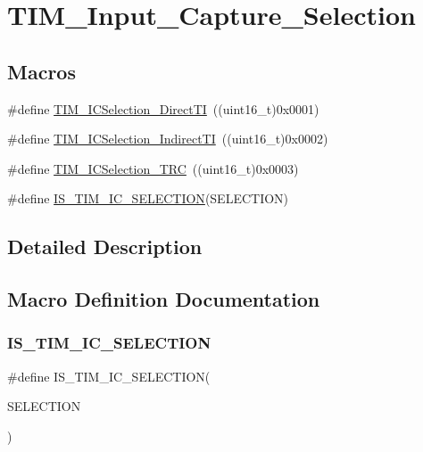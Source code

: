 \hypertarget{group___t_i_m___input___capture___selection}{}\section{T\+I\+M\+\_\+\+Input\+\_\+\+Capture\+\_\+\+Selection}
\label{group___t_i_m___input___capture___selection}
\subsection*{Macros}
\begin{DoxyCompactItemize}
\item 
\#define \mbox{\hyperlink{group___t_i_m___input___capture___selection_ga3d38876044457b7faefe951d367ac8c3}{T\+I\+M\+\_\+\+I\+C\+Selection\+\_\+\+Direct\+TI}}~((uint16\+\_\+t)0x0001)
\item 
\#define \mbox{\hyperlink{group___t_i_m___input___capture___selection_ga2289b684133ac0b81ddfcd860d01b144}{T\+I\+M\+\_\+\+I\+C\+Selection\+\_\+\+Indirect\+TI}}~((uint16\+\_\+t)0x0002)
\item 
\#define \mbox{\hyperlink{group___t_i_m___input___capture___selection_ga2cd464e97ffd6ea3208ec65672f9a373}{T\+I\+M\+\_\+\+I\+C\+Selection\+\_\+\+T\+RC}}~((uint16\+\_\+t)0x0003)
\item 
\#define \mbox{\hyperlink{group___t_i_m___input___capture___selection_ga623d8592109f4702829ae7fc3806bcb8}{I\+S\+\_\+\+T\+I\+M\+\_\+\+I\+C\+\_\+\+S\+E\+L\+E\+C\+T\+I\+ON}}(S\+E\+L\+E\+C\+T\+I\+ON)
\end{DoxyCompactItemize}


\subsection{Detailed Description}


\subsection{Macro Definition Documentation}
\mbox{\label{group___t_i_m___input___capture___selection_ga623d8592109f4702829ae7fc3806bcb8}} 
\subsubsection{\texorpdfstring{IS\_TIM\_IC\_SELECTION}{IS\_TIM\_IC\_SELECTION}}
{\footnotesize\ttfamily \#define I\+S\+\_\+\+T\+I\+M\+\_\+\+I\+C\+\_\+\+S\+E\+L\+E\+C\+T\+I\+ON(\begin{DoxyParamCaption}\item[{}]{S\+E\+L\+E\+C\+T\+I\+ON }\end{DoxyParamCaption})}

